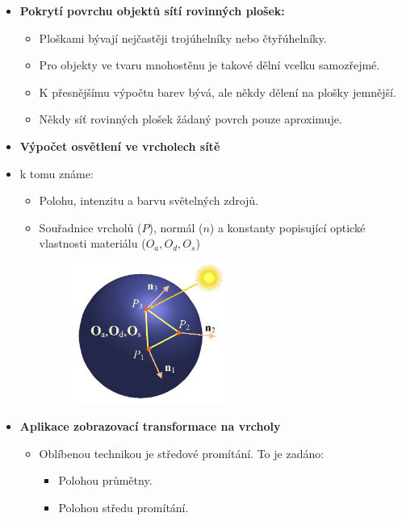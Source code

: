 \begin{itemize}
	\item  \textbf{Pokrytí povrchu objektů sítí rovinných plošek:}
	\begin{itemize}
		\item Ploškami bývají nejčastěji trojúhelníky nebo čtyřúhelníky.
		\item Pro objekty ve tvaru mnohostěnu je takové dělní vcelku samozřejmé.
		\item K přesnějšímu výpočtu barev bývá, ale někdy dělení na plošky jemnější.
		\item Někdy síť rovinných plošek žádaný povrch pouze aproximuje.
	\end{itemize}
	\item \textbf{Výpočet osvětlení ve vrcholech sítě}
	\item k tomu známe:
	\begin{itemize}
		\item Polohu, intenzitu a barvu světelných zdrojů.
		\item Souřadnice vrcholů ($P$), normál ($n$) a konstanty popisující optické vlastnosti materiálu ($O_a, O_d, O_s$)
		\begin{figure}[H]
		\centering
		\includegraphics[width=0.5\textwidth]{assets/5_vypocet_barevneho_vjemu}
		\end{figure}
	\end{itemize}
	\item \textbf{Aplikace zobrazovací transformace na vrcholy}
	\begin{itemize}
		\item Oblíbenou technikou je středové promítání. To je zadáno:
		\begin{itemize}
			\item Polohou průmětny.
			\item Polohou středu promítání.
		\end{itemize}
		\begin{figure}[H]

\end{figure}
\end{itemize}
\end{itemize}
